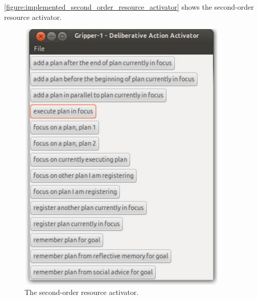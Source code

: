 {\mbox{\autoref{figure:implemented_second_order_resource_activator}}}
shows the second-order resource activator.
\begin{figure}
\begin{center}
\includegraphics[width=10cm]{gfx/implemented_second_order_resource_activator}
\end{center}
\caption[The second-order resource activator.]{The second-order
  resource activator.}
\label{figure:implemented_second_order_resource_activator}
\end{figure}

